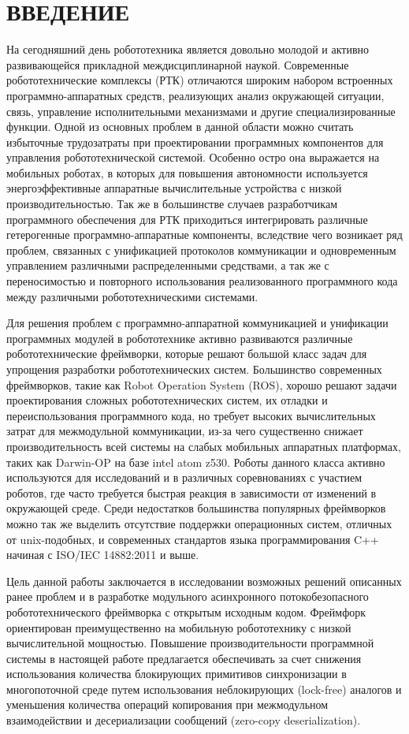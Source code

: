 \chapter*{ВВЕДЕНИЕ}

На сегодняшний день робототехника является довольно молодой и активно 
развивающейся прикладной междисциплинарной наукой. Современные 
робототехнические комплексы (РТК) отличаются широким набором встроенных 
программно-аппаратных средств, реализующих анализ окружающей ситуации, связь, 
управление исполнительными механизмами и другие специализированные функции. 
Одной из основных проблем в данной области можно считать избыточные трудозатраты при проектировании программных компонентов для управления робототехнической системой. Особенно остро она выражается на мобильных роботах, в которых для повышения автономности используется энергоэффективные аппаратные вычислительные устройства с низкой производительностью. Так же в большинстве случаев разработчикам программного обеспечения для РТК приходиться интегрировать различные гетерогенные программно-аппаратные компоненты, вследствие чего возникает ряд проблем, связанных с унификацией протоколов коммуникации и одновременным управлением различными распределенными средствами, а так же с переносимостью и повторного использования реализованного программного кода между различными робототехническими системами.

Для решения проблем с программно-аппаратной коммуникацией и унификации 
программных модулей в робототехнике активно развиваются различные 
робототехнические фреймворки, которые решают большой класс задач для упрощения разработки робототехнических систем. Большинство современных фреймворков, такие как Robot Operation System (ROS), хорошо решают задачи проектирования сложных робототехнических систем, их отладки и переиспользования программного кода, но требует высоких вычислительных затрат для межмодульной коммуникации, из-за чего существенно снижает производительность всей системы на слабых мобильных аппаратных платформах, таких как Darwin-OP на базе intel atom z530. Роботы данного класса активно используются для исследований и в различных соревнованиях с участием роботов, где часто требуется быстрая реакция в зависимости от изменений в окружающей среде. Среди недостатков большинства популярных фреймворков можно так же выделить отсутствие поддержки операционных систем, отличных от unix-подобных, и современных стандартов языка программирования C++ начиная с ISO/IEC 14882:2011 \cite{c++2011iso} и выше.

Цель данной работы заключается в исследовании возможных решений описанных ранее проблем и в разработке модульного асинхронного потокобезопасного робототехнического фреймворка с открытым исходным кодом. Фреймфорк ориентирован преимущественно на мобильную робототехнику с низкой вычислительной мощностью. Повышение производительности программной системы в настоящей работе предлагается обеспечивать за счет снижения использования количества блокирующих примитивов синхронизации в многопоточной среде путем использования неблокирующих (lock-free) аналогов и уменьшения количества операций копирования при межмодульном взаимодействии и десериализации сообщений (zero-copy deserialization).
